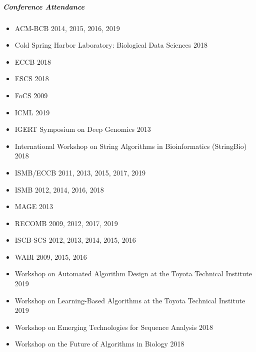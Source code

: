 \documentclass[10pt,letterpaper]{article}
\begin{document}
\subparagraph{Conference Attendance}
\begin{itemize}
	\item ACM-BCB 2014, 2015, 2016, 2019
	\item Cold Spring Harbor Laboratory: Biological Data Sciences 2018
	\item ECCB 2018
	\item ESCS 2018
	\item FoCS 2009
	\item ICML 2019
	\item IGERT Symposium on Deep Genomics 2013
	\item International Workshop on String Algorithms in Bioinformatics (StringBio) 2018
	\item ISMB/ECCB 2011, 2013, 2015, 2017, 2019
	\item ISMB 2012, 2014, 2016, 2018
	\item MAGE 2013
	\item RECOMB 2009, 2012, 2017, 2019
	\item ISCB-SCS 2012, 2013, 2014, 2015, 2016
	\item WABI 2009, 2015, 2016
	\item Workshop on Automated Algorithm Design at the Toyota Technical Institute 2019
	\item Workshop on Learning-Based Algorithms at the Toyota Technical Institute 2019
	\item Workshop on Emerging Technologies for Sequence Analysis 2018
	\item Workshop on the Future of Algorithms in Biology 2018
\end{itemize}
\end{document}
